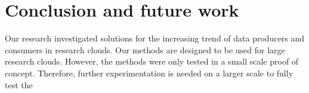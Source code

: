 \section{Conclusion and future work}
\label{fut}
\label{conc}










Our research investigated solutions for the increasing trend of data producers and consumers in research clouds. Our methods are designed to be used for large research clouds. However, the methods were only tested in a small scale proof of concept. Therefore, further experimentation is needed on a larger scale to fully test the 

